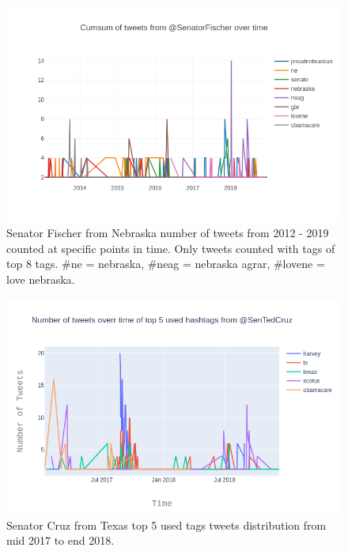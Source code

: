 \documentclass[10pt,conference,compsocconf]{IEEEtran}
\begin{document}
\begin{figure}
	\centering
	\includegraphics[width=0.7\linewidth]{images/senator_fischer_before_after_election}
	\caption{Senator Fischer from Nebraska number of tweets from 2012 - 2019 counted at specific points in time. Only tweets counted with tags of top 8 tags. \#ne = nebraska, \#neag = nebraska agrar, \#lovene = love nebraska.   }
	\label{fig:senatorfischerbeforeafterelection}
\end{figure}
\begin{figure}
	\centering
	\includegraphics[width=0.7\linewidth]{images/senator_cruz_top5_tweets_mid2017_2018}
	\caption{Senator Cruz from Texas top 5 used tags tweets distribution from mid 2017 to end 2018.}
	\label{fig:senatorcruztop5tweetsmid20172018}
\end{figure}
\end{document}
